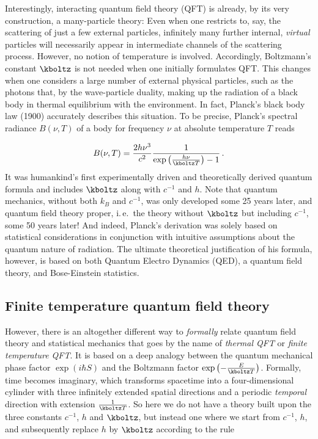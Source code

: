 
\newpage {}
\label{sec:0111}

Interestingly, interacting quantum field theory (QFT) is already, by its very construction, a many-particle theory: Even when one restricts to, say, the scattering of just a few external particles, infinitely many further internal, \emph{virtual} particles will necessarily appear in intermediate channels of the scattering process. However, no notion of temperature is involved. Accordingly, Boltzmann's constant $\kboltz$ is not needed when one initially formulates QFT. This changes when one considers a large number of external physical particles, such as the photons that, by the wave-particle duality, making up the radiation of a black body in thermal equilibrium with the environment. In fact, Planck's black body law (1900) accurately describes this situation. To be precise, Planck's spectral radiance $B(\nu,T)$ of a body for frequency $\nu$ at absolute temperature $T$ reads

\begin{equation*}
  B(\nu,T)=\frac{2 h \nu^3}{c^2} \frac{1}{\exp\left(\frac{h \nu}{\kboltz T}\right)-1}\,.
\end{equation*}
%
It was humankind's first experimentally driven and theoretically derived quantum formula and includes $\kboltz$ along with $c^{-1}$ and $h$. Note that quantum mechanics, without both $k_B$ and $c^{-1}$, was only developed some 25 years later, and quantum field theory proper, i.\,e.\ the theory without $\kboltz$ but including $c^{-1}$, some 50 years later! And indeed, Planck's derivation was solely based on statistical considerations in conjunction with intuitive assumptions about the quantum nature of radiation. The ultimate theoretical justification of his formula, however, is based on both Quantum Electro Dynamics (QED), a quantum field theory, and Bose-Einstein statistics.


\subsection*{Finite temperature quantum field theory}

However, there is an altogether different way to \emph{formally} relate quantum field theory and statistical mechanics that goes by the name of \emph{thermal QFT} or \emph{finite temperature QFT}. It is based on a deep analogy between the quantum mechanical phase factor $\exp\left(i \hbar S\right)$ and the Boltzmann factor $\exp\left(-\frac{E}{\kboltz T}\right)$. Formally, time becomes imaginary, which transforms spacetime into a four-dimensional cylinder with three infinitely extended spatial directions and a periodic \emph{temporal} direction with extension
$\frac{1}{\kboltz T}$. So here we do not have a theory built upon the three constants $c^{-1}$, $h$ and $\kboltz$, but instead one where we start from $c^{-1}$, $h$, and subsequently replace $h$ by $\kboltz$ according to the rule

